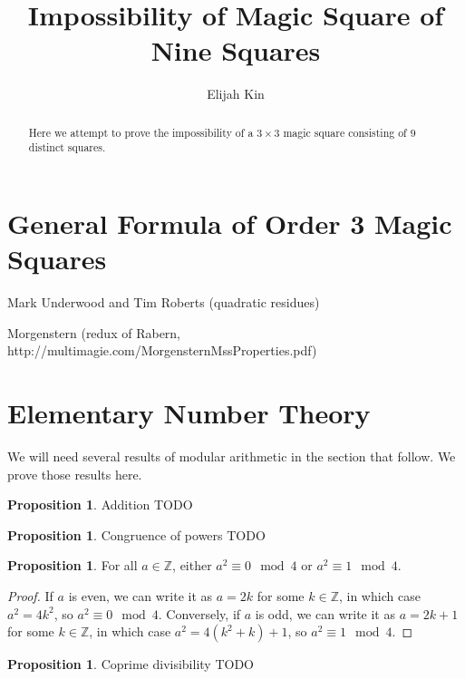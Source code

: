 \documentclass[11pt]{amsart}
\title{Impossibility of Magic Square of Nine Squares}
\author{Elijah Kin}
\theoremstyle{definition}
\newtheorem{prop}[thm]{Proposition}
\begin{document}
\maketitle

\begin{abstract}
  Here we attempt to prove the impossibility of a $3 \times 3$ magic square consisting of $9$ distinct squares.
\end{abstract}

\section{General Formula of Order 3 Magic Squares}
\cite{alphamagic}
\cite{Boyer2005}
\cite{rabern}
\cite{gardner}

Mark Underwood and Tim Roberts (quadratic residues)

Morgenstern (redux of Rabern, http://multimagie.com/MorgensternMssProperties.pdf)

\section{Elementary Number Theory}
We will need several results of modular arithmetic in the section that follow. We prove those results here.
\begin{prop}
  Addition TODO
\end{prop}

\begin{prop}
  Congruence of powers TODO
\end{prop}

\begin{prop}
  For all $a \in \mathbb{Z}$, either $a^2 \equiv 0 \mod 4$ or $a^2 \equiv 1 \mod 4$.
  \begin{proof}
    If $a$ is even, we can write it as $a = 2k$ for some $k \in \mathbb{Z}$, in which case $a^2 = 4k^2$, so $a^2 \equiv 0 \mod 4$. Conversely, if $a$ is odd, we can write it as $a = 2k + 1$ for some $k \in \mathbb{Z}$, in which case $a^2 = 4(k^2 + k) + 1$, so $a^2 \equiv 1 \mod 4$.
  \end{proof}
\end{prop}

\begin{prop}
  Coprime divisibility TODO
\end{prop}
\end{document}

